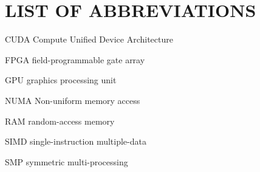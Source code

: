 \documentclass[tocnosub,noragright,centerchapter,12pt]{uiucecethesis09}
\begin{document}
%
\chapter{LIST OF ABBREVIATIONS}

\begin{symbollist*}
	\item[CUDA] Compute Unified Device Architecture
	\item[FPGA] field-programmable gate array
	\item[GPU] graphics processing unit
	\item[NUMA] Non-uniform memory access
	\item[RAM] random-access memory
	\item[SIMD] single-instruction multiple-data
	\item[SMP] symmetric multi-processing
\end{symbollist*}


%

\mainmatter

%












\backmatter

%




%
	
\end{document}
